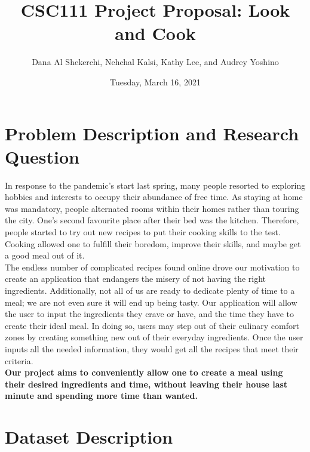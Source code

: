 \documentclass[fontsize=11pt]{article}
\title{CSC111 Project Proposal: Look and Cook}
\author{Dana Al Shekerchi, Nehchal Kalsi, Kathy Lee, and Audrey Yoshino}
\date{Tuesday, March 16, 2021}
\begin{document}
    \maketitle

    \section*{Problem Description and Research Question}
    In response to the pandemic's start last spring, many people resorted to exploring hobbies and interests to occupy their abundance of free time. As staying at home was mandatory, people alternated rooms within their homes rather than touring the city. One's second favourite place after their bed was the kitchen. Therefore, people started to try out new recipes to put their cooking skills to the test. Cooking allowed one to fulfill their boredom, improve their skills, and maybe get a good meal out of it. \\

    The endless number of complicated recipes found online drove our motivation to create an application that endangers the misery of not having the right ingredients. Additionally, not all of us are ready to dedicate plenty of time to a meal; we are not even sure it will end up being tasty. Our application will allow the user to input the ingredients they crave or have, and the time they have to create their ideal meal. In doing so, users may step out of their culinary comfort zones by creating something new out of their everyday ingredients. Once the user inputs all the needed information, they would get all the recipes that meet their criteria. \\

    \textbf{Our project aims to conveniently allow one to create a meal using their desired ingredients and time, without leaving their house last minute and spending more time than wanted.} \\


    \section*{Dataset Description}
\end{document}
